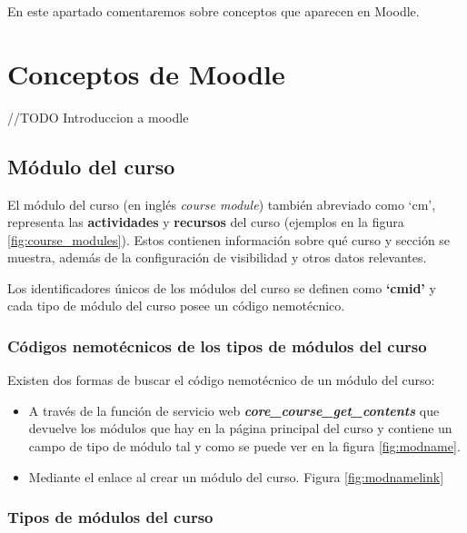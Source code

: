 
En este apartado comentaremos sobre conceptos que aparecen en Moodle.



\section{Conceptos de Moodle}

//TODO Introduccion a moodle

\subsection{Módulo del curso}
El módulo del curso \cite{noauthor_course_nodate} (en inglés \textit{course module}) también abreviado como `cm', representa las \textbf{actividades} y \textbf{recursos} del curso (ejemplos en la figura \ref{fig:course_modules}). Estos contienen información sobre qué curso y sección se muestra, además de la configuración de visibilidad y otros datos relevantes. 


Los identificadores únicos de los módulos del curso se definen como \textbf{`cmid'} y cada tipo de módulo del curso posee un código nemotécnico.


\subsubsection{Códigos nemotécnicos de los tipos de módulos del curso}

Existen dos formas de buscar el código nemotécnico de un módulo del curso:
\begin{itemize}
	\item A través de la función de servicio web \textbf{\textit{core\_course\_get\_contents}} que devuelve los módulos que hay en la página principal del curso y contiene un campo de tipo de módulo tal y como se puede ver en la figura \ref{fig:modname}.
	
	\item Mediante el enlace al crear un módulo del curso. Figura \ref{fig:modnamelink}
	
\end{itemize}

\subsubsection{Tipos de módulos del curso}

